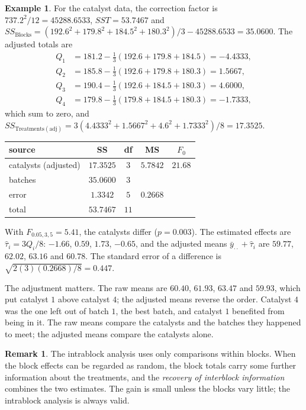 \documentclass[11pt,a4paper]{article}
\numberwithin{equation}{section}
\theoremstyle{definition}
\newtheorem{exa}[thm]{Example}
\newtheorem*{remark}{Remark}
\begin{document}
\begin{exa}\label{exa:catalysts-anova}
For the catalyst data, the correction factor is $737.2^2/12 = 45288.6533$, $SST = 53.7467$ and $SS_{\mathrm{Blocks}} = (192.6^2 + 179.8^2 + 184.5^2 + 180.3^2)/3 - 45288.6533 = 35.0600$. The
adjusted totals are
\begin{align*}
Q_1 &= 181.2 - \tfrac13(192.6 + 179.8 + 184.5) = -4.4333 , \\
Q_2 &= 185.8 - \tfrac13(192.6 + 179.8 + 180.3) = 1.5667 , \\
Q_3 &= 190.4 - \tfrac13(192.6 + 184.5 + 180.3) = 4.6000 , \\
Q_4 &= 179.8 - \tfrac13(179.8 + 184.5 + 180.3) = -1.7333 ,
\end{align*}
which sum to zero, and $SS_{\mathrm{Treatments(adj)}} = 3(4.4333^2 + 1.5667^2 + 4.6^2 + 1.7333^2)/8 = 17.3525$.
\begin{center}
\begin{tabular}{l|c|c|c|c}
source & SS & df & MS & $F_0$ \\
\hline
catalysts (adjusted) & $17.3525$ & $3$ & $5.7842$ & $21.68$ \\
batches & $35.0600$ & $3$ & & \\
error & $1.3342$ & $5$ & $0.2668$ & \\
\hline
total & $53.7467$ & $11$ & &
\end{tabular}
\end{center}
With $F_{0.05,3,5} = 5.41$, the catalysts differ ($p = 0.003$). The estimated effects are $\hat\tau_i = 3Q_i/8$: $-1.66$, $0.59$, $1.73$, $-0.65$, and the adjusted means
$\bar y_{\cdot\cdot} + \hat\tau_i$ are $59.77$, $62.02$, $63.16$ and $60.78$. The standard error of a difference is $\sqrt{2(3)(0.2668)/8} = 0.447$.

The adjustment matters. The raw means are $60.40$, $61.93$, $63.47$ and $59.93$, which put catalyst $1$ above catalyst $4$; the adjusted means reverse the
order. Catalyst $4$ was the one left out of batch $1$, the best batch, and catalyst $1$ benefited from being in it. The raw means compare the
catalysts and the batches they happened to meet; the adjusted means compare the catalysts alone.
\end{exa}

\begin{remark}
The intrablock analysis uses only comparisons within blocks. When the block effects can be regarded as random, the block totals carry some
further information about the treatments, and the \emph{recovery of interblock information} combines the two estimates. The gain is small unless
the blocks vary little; the intrablock analysis is always valid.
\end{remark}
\end{document}
